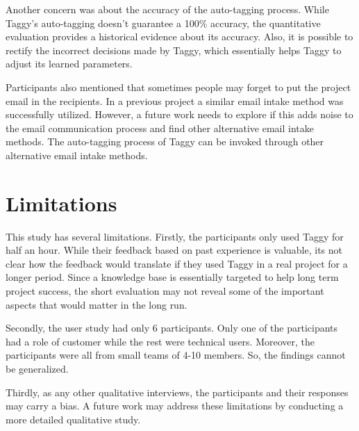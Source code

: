 Another concern was about the accuracy of the auto-tagging process. While Taggy's auto-tagging doesn't guarantee a 100\% accuracy, the quantitative evaluation provides a historical evidence about its accuracy. Also, it is possible to rectify the incorrect decisions made by Taggy, which essentially helps Taggy to adjust its learned parameters.

Participants also mentioned that sometimes people may forget to put the project email in the recipients. In a previous project a similar email intake method was successfully utilized\cite{where_did_you}. However, a future work needs to explore if this adds noise to the email communication process and find other alternative email intake methods. The auto-tagging process of Taggy can be invoked through other alternative email intake methods.

\section{Limitations}
This study has several limitations. Firstly, the participants only used Taggy for half an hour. While their feedback based on past experience is valuable, its not clear how the feedback would translate if they used Taggy in a real project for a longer period. Since a knowledge base is essentially targeted to help long term project success, the short evaluation may not reveal some of the important aspects that would matter in the long run.

Secondly, the user study had only 6 participants. Only one of the participants had a role of customer while the rest were technical users. Moreover, the participants were all from small teams of 4-10 members. So, the findings cannot be generalized.

Thirdly, as any other qualitative interviews, the participants and their responses may carry a bias. A future work may address these limitations by conducting a more detailed qualitative study.



